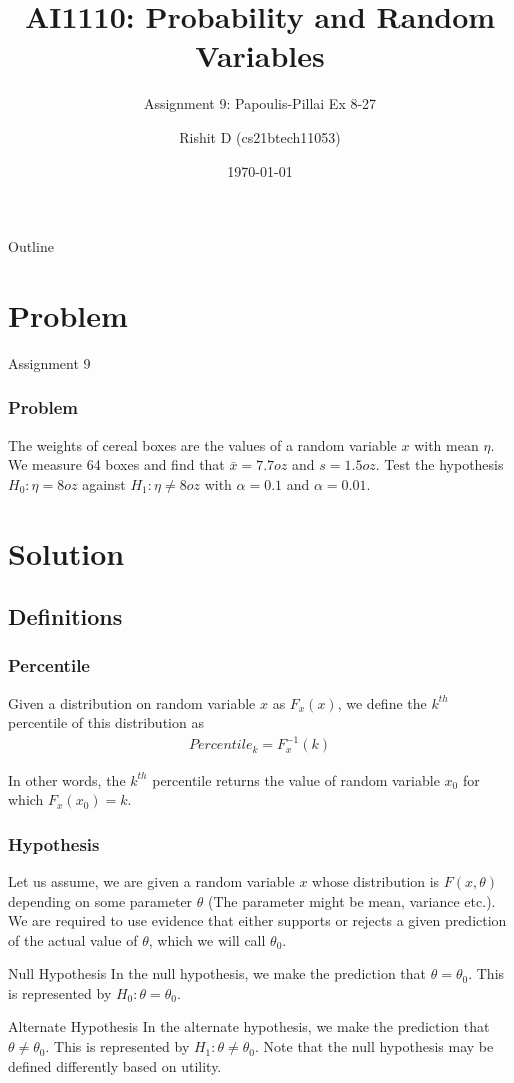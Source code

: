 \documentclass{beamer}
\title{AI1110: Probability and Random Variables}
\subtitle{Assignment 9: Papoulis-Pillai Ex 8-27}
\author{Rishit D (cs21btech11053)}
\institute{IIT Hyderabad}
\date{\today}
\begin{document}
\begin{frame}
	\titlepage 
\end{frame}

\begin{frame}{Outline}
	\tableofcontents
\end{frame}

\section{Problem}

\begin{frame}{Assignment 9}
	\frametitle{Problem}
	The weights of cereal boxes are the values of a random variable $x$ with mean $\eta$. We measure 64 boxes and find that $\bar{x} = 7.7 oz$ and $s = 1.5 oz$. Test the hypothesis $H_0 : \eta = 8 oz$ against $H_1 : \eta \neq 8 oz$ with $\alpha = 0.1$ and $\alpha = 0.01$.
\end{frame}

\section{Solution}

\subsection{Definitions}
\begin{frame}
	\frametitle{Percentile}
	Given a distribution on random variable $x$ as $F_x(x)$, we define the $k^{th}$ percentile of this distribution as
	\begin{align}
		Percentile_k = F_x^{-1}(k)
		\label{eq:Percentile}
	\end{align}

	In other words, the $k^{th}$ percentile returns the value of random variable $x_0$ for which $F_x(x_0) = k$.
\end{frame}

\begin{frame}
	\frametitle{Hypothesis}
	Let us assume, we are given a random variable $x$ whose distribution is $F(x, \theta)$ depending on some parameter $\theta$ (The parameter might be mean, variance etc.). We are required to use evidence that either supports or rejects a given prediction of the actual value of $\theta$, which we will call $\theta_0$.
	
	\begin{block}{Null Hypothesis}
		In the null hypothesis, we make the prediction that $\theta = \theta_0$. This is represented by $H_0 : \theta = \theta_0$.
	\end{block}
	
	\begin{block}{Alternate Hypothesis}
		In the alternate hypothesis, we make the prediction that $\theta \neq \theta_0$. This is represented by $H_1 : \theta \neq \theta_0$. Note that the null hypothesis may be defined differently based on utility.
	\end{block}	

\end{frame}
\end{document}
